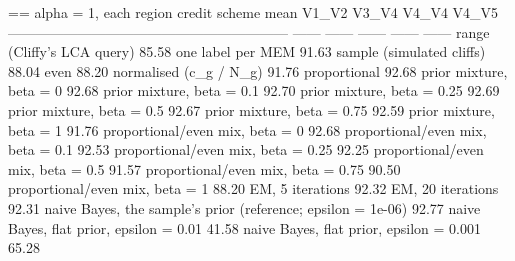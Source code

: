 == alpha = 1, each region
  credit scheme                                                   mean   V1_V2   V3_V4   V4_V4   V4_V5
  ------------------------------------------------------------  ------  ------  ------  ------  ------
  range (Cliffy's LCA query)                                    85.58%
  one label per MEM                                             91.63%
  sample (simulated cliffs)                                     88.04%
  even                                                          88.20%
  normalised (c_g / N_g)                                        91.76%
  proportional                                                  92.68%
  prior mixture, beta = 0                                       92.68%
  prior mixture, beta = 0.1                                     92.70%
  prior mixture, beta = 0.25                                    92.69%
  prior mixture, beta = 0.5                                     92.67%
  prior mixture, beta = 0.75                                    92.59%
  prior mixture, beta = 1                                       91.76%
  proportional/even mix, beta = 0                               92.68%
  proportional/even mix, beta = 0.1                             92.53%
  proportional/even mix, beta = 0.25                            92.25%
  proportional/even mix, beta = 0.5                             91.57%
  proportional/even mix, beta = 0.75                            90.50%
  proportional/even mix, beta = 1                               88.20%
  EM, 5 iterations                                              92.32%
  EM, 20 iterations                                             92.31%
  naive Bayes, the sample's prior (reference; epsilon = 1e-06)  92.77%
  naive Bayes, flat prior, epsilon = 0.01                       41.58%
  naive Bayes, flat prior, epsilon = 0.001                      65.28%
